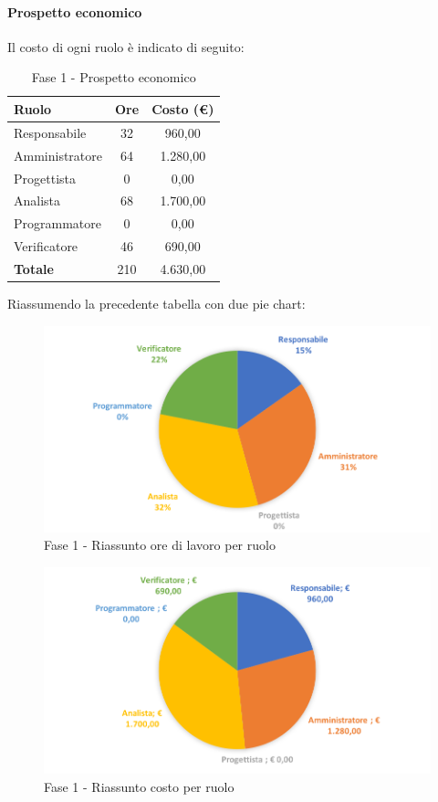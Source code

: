 \documentclass[../PianoDiProgetto.tex]{subfiles}
\begin{document}
			\newpage
			\paragraph{Prospetto economico}
			Il costo di ogni ruolo è indicato di seguito:
			\begin{table}[h]
				\centering
				\begin{tabular}{l * {2}{c}}
				\toprule
				\textbf{Ruolo} & \textbf{Ore} & \textbf{Costo (\euro{})} \\
				\midrule
				Responsabile & 32 & 960,00 \\
				Amministratore & 64 & 1.280,00 \\
				Progettista & 0 & 0,00 \\
				Analista & 68 & 1.700,00 \\		
				Programmatore & 0 & 0,00 \\		
				Verificatore & 46 & 690,00 \\				
				\midrule		
				\textbf{Totale} & 210 & 4.630,00 \\
				\bottomrule	
				\end{tabular}
				\caption{Fase 1 - Prospetto economico}		
			\end{table}
			
			Riassumendo la precedente tabella con due pie chart:	
			\begin{figure}[!h]
				\centering
				\includegraphics[width=\textwidth]{Preventivo/Immagini/fase1_oreRuolo.png}
				\caption{Fase 1 - Riassunto ore di lavoro per ruolo}
			\end{figure}	
			\newpage
			\begin{figure}[!h]
				\centering
				\includegraphics[width=\textwidth]{Preventivo/Immagini/fase1_costoRuolo.png}
				\caption{Fase 1 - Riassunto costo per ruolo}
			\end{figure}	
			
\end{document}

